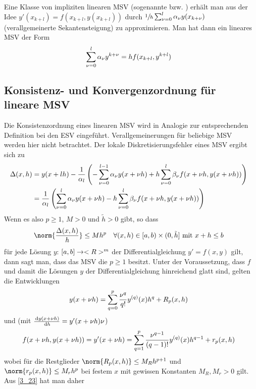 Eine Klasse von impliziten linearen MSV (sogenannte  bzw. ) erhält man aus der Idee $y'(x_{k+l}) = f(x_{k+l},y(x_{k+l}))$ durch $\sfrac{1}{h}\sum_{\nu=0}^l \alpha_\nu y(x_{k+\nu})$ (verallgemeinerte Sekantensteigung) zu approximieren. Man hat dann ein lineares MSV der Form
\begin{align}
	\sum_{\nu=0}^l \alpha_\nu y^{k+\nu} = hf(x_{k+l},y^{k+l}) \notag
\end{align}

\subsection{Konsistenz- und Konvergenzordnung für lineare MSV}

Die Konsistenzordnung eines linearen MSV wird in Analogie zur entsprechenden Definition bei den ESV eingeführt. Verallgemeinerungen für beliebige MSV werden hier nicht betrachtet. Der lokale Diskretisierungsfehler eines MSV ergibt sich zu
\begin{align}
	\Delta(x,h) &= y(x+lh) - \frac{1}{\alpha_l}\left(-\sum_{\nu=0}^{l-1} \alpha_\nu y(x+\nu h) + h\sum_{\nu=0}^l \beta_\nu f(x+\nu h,y(x+\nu h))\right) \notag \\
	\label{3_23}
	&= \frac{1}{\alpha_l} \left(\sum_{\nu=0}^l \alpha_\nu y(x+\nu h) - h\sum_{\nu=0}^l \beta_\nu f(x+\nu h,y(x+\nu h))\right)
\end{align}
Wenn es also $p\ge 1$, $M>0$ und $\tilde{h}>0$ gibt, so dass
\begin{align}
	\norm{\frac{\Delta(x,h)}{h}} \le Mh^p\quad\forall (x,h)\in [a,b)\times (0,\tilde{h}]\text{ mit } x+h\le b \notag
\end{align}
für jede Lösung $y$: $[a,b]\to<R>^m$ der Differentialgleichung $y'=f(x,y)$ gilt, dann sagt man, dass das MSV die  $p\ge 1$ besitzt. Unter der Voraussetzung, dass $f$ und damit die Lösungen $y$ der Differentialgleichung hinreichend glatt sind, gelten die Entwicklungen
\begin{align}
	y(x+\nu h) = \sum_{q=0}^{p} \frac{\nu^q}{q!} y^{(q)}(x) h^q + R_p(x,h) \notag
\end{align}
und (mit $\frac{\,\mathrm{d} y(x+\nu h)}{\,\mathrm{d} h} = y'(x+\nu h)\nu$)
\begin{align}
	f(x+\nu h,y(x+\nu h)) = y'(x+\nu h) = \sum_{q=1}^{p} \frac{\nu^{q-1}}{(q-1)!} y^{(q)}(x)h^{q-1} + r_p(x,h) \notag
\end{align}
wobei für die Restglieder $\norm{R_p(x,h)} \le M_R h^{p+1}$ und $\norm{r_p(x,h)}\le M_r h^p$ bei festem $x$ mit gewissen Konstanten $M_R,M_r>0$ gilt. Aus \cref{3_23} hat man daher

